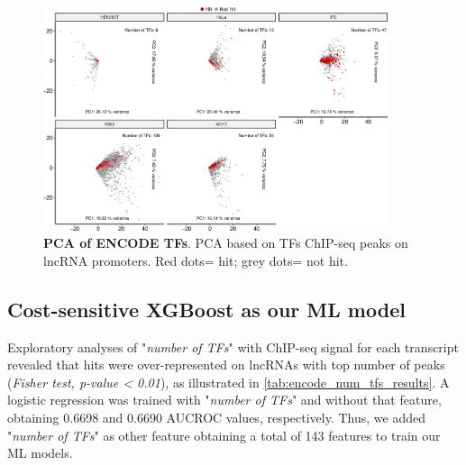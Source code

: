 \begin{figure}[ht!]
  \centering
  \includegraphics[width=0.9\textwidth]{plots/results/ml/pca.tf.encode.percell.png}
  \caption[PCA of ENCODE TFs]{\textbf{PCA of ENCODE TFs}. PCA based on TFs ChIP-seq peaks on lncRNA promoters. Red dots= hit; grey dots= not hit.}
  \label{fig:pca-encode}
\end{figure}

\clearpage

\subsection{Cost-sensitive XGBoost as our ML model}
\label{sec:build-eval-model}

Exploratory analyses of "\textit{number of TFs}" with ChIP-seq signal for each transcript revealed that hits were over-represented on lncRNAs with top number of peaks (\textit{Fisher test, p-value < 0.01}), as illustrated in \autoref{tab:encode_num_tfs_results}. A logistic regression was trained with "\textit{number of TFs}" and without that feature, obtaining 0.6698 and 0.6690 AUCROC values, respectively. Thus, we added "\textit{number of TFs}" as other feature obtaining a total of 143 features to train our ML models. 

